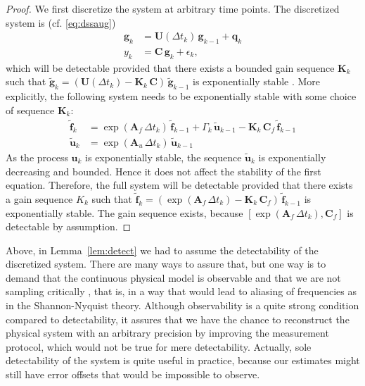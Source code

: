 \documentclass[journal]{IEEEtran}
\begin{document}
\begin{proof}
We first discretize the system at arbitrary time points. The discretized system is (cf. \eqref{eq:dssaug})
%
\begin{equation}
\begin{split}
   \mathbf{g}_k &= \mathbf{U}(\Delta t_k) \, \mathbf{g}_{k-1} +  \mathbf{q}_k \\
  y_k &=  \mathbf{C} \,  \mathbf{g}_k + \epsilon_k,
\end{split}
\end{equation}
%
which will be detectable provided that there exists a bounded gain sequence $\mathbf{K}_k$ such that $\tilde{\mathbf{g}}_k = (\mathbf{U}(\Delta t_k) - \mathbf{K}_k \, \mathbf{C}) \, \tilde{\mathbf{g}}_{k-1}$ is exponentially stable \cite{Anderson:1981}. More explicitly, the following system needs to be exponentially stable with some choice of sequence $\mathbf{K}_k$:
%
\begin{equation}
\begin{split}
  \tilde{\mathbf{f}}_k &= \exp(\mathbf{A}_f \, \Delta t_k) \, \tilde{\mathbf{f}}_{k-1}
  + \Gamma_k \, \tilde{\mathbf{u}}_{k-1} - \mathbf{K}_k \, \mathbf{C}_f \, \tilde{\mathbf{f}}_{k-1} \\
  \tilde{\mathbf{u}}_k &= \exp(\mathbf{A}_u \, \Delta t_k) \, \tilde{\mathbf{u}}_{k-1} 
\end{split}
\end{equation}
%
As the process $\mathbf{u}_k$ is exponentially stable, the sequence $\tilde{\mathbf{u}}_k$ is exponentially decreasing and bounded. Hence it does not affect the stability of the first equation. Therefore, the full system will be detectable provided that there exists a gain sequence $K_k$ such that $\tilde{\mathbf{f}}_k = (\exp(\mathbf{A}_f \, \Delta t_k) - \mathbf{K}_k \, \mathbf{C}_f) \, \tilde{\mathbf{f}}_{k-1}$ is exponentially stable. The gain sequence exists, because $[\exp(\mathbf{A}_f \, \Delta t_k),\mathbf{C}_f]$ is detectable by assumption. 
\end{proof}

Above, in Lemma~\ref{lem:detect} we had to assume the detectability of the discretized system. There are many ways to assure that, but one way is to demand that the continuous physical model is observable and that we are not sampling critically \cite{Ding:2009}, that is, in a way that would lead to aliasing of frequencies as in the Shannon-Nyquist theory. Although observability is a quite strong condition compared to detectability, it assures that we have the chance to reconstruct the physical system with an arbitrary precision by improving the measurement protocol, which would not be true for mere detectability. Actually, sole detectability of the system is quite useful in practice, because our estimates might still have error offsets that would be impossible to observe.
\end{document}
